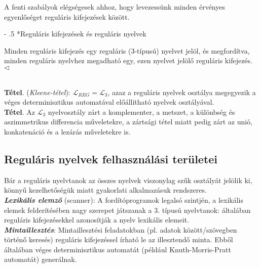 \documentclass[12pt,margin=0px]{article}
\makeatletter
\renewcommand\paragraph{%
	\@startsection{paragraph}{4}{0mm}%
	{-\baselineskip}%
	{.5\baselineskip}%
	{\normalfont\normalsize\bfseries}}
\makeatother
\begin{document}
{    \noindent A fenti szabályok elégségesek ahhoz, hogy levezessünk minden érvényes egyenlőséget reguláris kifejezések között.
	
    \paragraph*{Reguláris kifejezések és reguláris nyelvek}

    \noindent Minden reguláris kifejezés egy reguláris (3-típusú) nyelvet jelöl, és megfordítva, minden reguláris nyelvhez megadható egy, ezen nyelvet jelölő reguláris kifejezés.\\
    $\triangleleft$ \faLightbulbO}\\

    \noindent \textbf{Tétel}. (\emph{Kleene-tétel}): $\mathcal{L}_{REG} = \mathcal{L}_{3}$, azaz a reguláris nyelvek osztálya megegyezik a véges determinisztikus automatával előállítható nyelvek osztályával.\\

    \noindent \textbf{Tétel}. Az $\mathcal{L}_3$ nyelvosztály zárt a komplementer, a metszet, a különbség és aszimmetrikus differencia műveletekre, a zártsági tétel miatt pedig zárt az unió, konkatenáció és a lezárás műveletekre is.\\

    \subsection*{Reguláris nyelvek felhasználási területei\\}

    Bár a reguláris nyelvtanok az összes nyelvek viszonylag szűk osztályát jelölik ki, könnyű kezelhetőségük miatt gyakorlati alkalmazásuk rendszeres.\\

    \noindent \textbf{\emph{Lexikális elemző}} (scanner): A fordítóprogramok legalsó szintjén, a lexikális elemek felderítésében nagy szerepet játszanak a 3. típusú nyelvtanok: általában reguláris kifejezésekkel azonosítják a nyelv lexikális elemeit.\\

    \noindent \textbf{\emph{Mintaillesztés}}: Mintaillesztési feladatokban (pl. adatok között/szövegben történő keresés) reguláris kifejezéssel írható le az illesztendő minta. Ebből általában véges determinisztikus automatát (például Knuth-Morris-Pratt automatát) generálnak.\\
	
\end{document}
